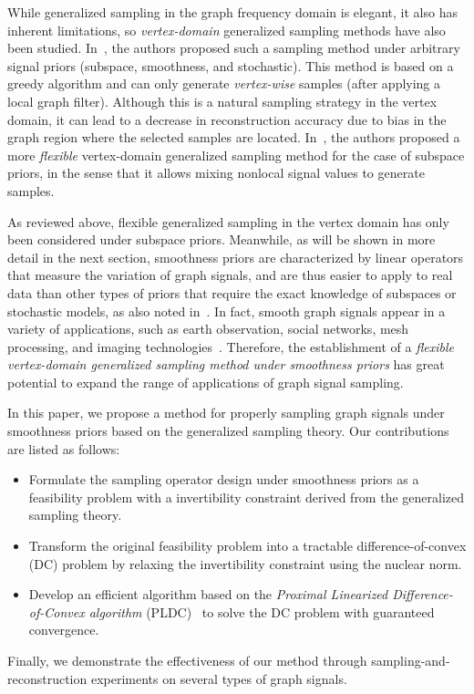 \documentclass[10pt,journal]{IEEEtran}
\theoremstyle{plain}
\begin{document}
 While generalized sampling in the graph frequency domain is elegant, it also has inherent limitations, so \textit{vertex-domain} generalized sampling methods have also been studied. In~\cite{Hara2022GSSS}, the authors proposed such a sampling method under arbitrary signal priors (subspace, smoothness, and stochastic). This method is based on a greedy algorithm and can only generate \textit{vertex-wise} samples (after applying a local graph filter). Although this is a natural sampling strategy in the vertex domain, it can lead to a decrease in reconstruction accuracy due to bias in the graph region where the selected samples are located. In~\cite{Hara2021Design}, the authors proposed a more \textit{flexible} vertex-domain generalized sampling method for the case of subspace priors, in the sense that it allows mixing nonlocal signal values to generate samples.

As reviewed above, flexible generalized sampling in the vertex domain has only been considered under subspace priors. Meanwhile, as will be shown in more detail in the next section, smoothness priors are characterized by linear operators that measure the variation of graph signals, and are thus easier to apply to real data than other types of priors that require the exact knowledge of subspaces or stochastic models, as also noted in~\cite{Eldar2015sampling,Tanaka2020GenSamp}. In fact, smooth graph signals appear in a variety of applications, such as earth observation, social networks, mesh processing, and imaging technologies~\cite{ono2015total,onuki2016graph,dong2016learning,zare2020fusing,Saboksayr2021learning,takemoto2022graph,Yamagata2021recovery,Yamagata2022Robust,einizade2023joint}. Therefore, the establishment of a \textit{flexible vertex-domain generalized sampling method under smoothness priors} has great potential to expand the range of applications of graph signal sampling.

In this paper, we propose a method for properly sampling graph signals under smoothness priors based on the generalized sampling theory. Our contributions are listed as follows:
\begin{itemize}
\item Formulate the sampling operator design under smoothness priors as a feasibility problem with a invertibility constraint derived from the generalized sampling theory.
\item Transform the original feasibility problem into a tractable difference-of-convex (DC) problem by relaxing the invertibility constraint using the nuclear norm.
\item Develop an efficient algorithm based on the \textit{Proximal Linearized Difference-of-Convex algorithm} (PLDC)~\cite{Souza2016PLDC} to solve the DC problem with guaranteed convergence.
\end{itemize}
Finally, we demonstrate the effectiveness of our method through sampling-and-reconstruction experiments on several types of graph signals.
\end{document}

